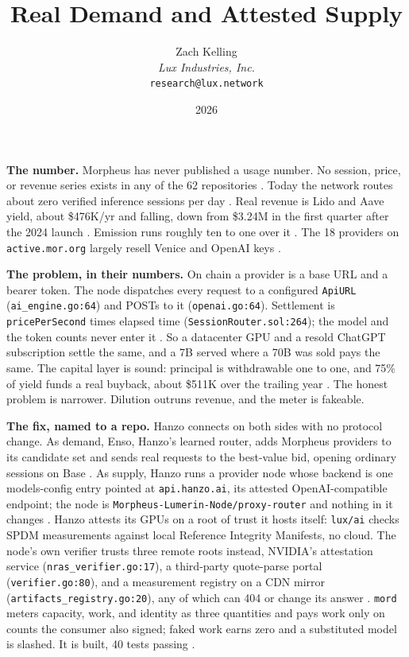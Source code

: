 \documentclass[11pt,a4paper]{article}
\title{Real Demand and Attested Supply}
\author{Zach Kelling\\\textit{Lux Industries, Inc.}\\\texttt{research@lux.network}}
\date{2026}
\newcommand{\code}[1]{\texttt{\small #1}}
\newcommand{\prov}[1]{{\color{muted}\scriptsize\sffamily[#1]}}
\begin{document}
\luxcoverpage
\sloppy

\par
\vspace{0.9ex}

\noindent\textbf{The number.}
Morpheus has never published a usage number. No session, price, or revenue series exists
in any of the 62 repositories \prov{verified}. Today the network routes about zero verified
inference sessions per day \prov{verified}. Real revenue is Lido and Aave yield, about
\$476K/yr and falling, down from \$3.24M in the first quarter after the 2024 launch
\prov{verified}. Emission runs roughly ten to one over it \prov{verified}. The 18 providers
on \code{active.mor.org} largely resell Venice and OpenAI keys \prov{verified}.

\vspace{0.35ex}
\noindent\textbf{The problem, in their numbers.}
On chain a provider is a base URL and a bearer token. The node dispatches every request to a
configured \code{ApiURL} (\code{ai\_engine.go:64}) and POSTs to it (\code{openai.go:64}).
Settlement is \code{pricePerSecond} times elapsed time (\code{SessionRouter.sol:264}); the
model and the token counts never enter it \prov{verified}. So a datacenter GPU and a resold
ChatGPT subscription settle the same, and a 7B served where a 70B was sold pays the same. The
capital layer is sound: principal is withdrawable one to one, and 75\% of yield funds a real
buyback, about \$511K over the trailing year \prov{verified}. The honest problem is narrower.
Dilution outruns revenue, and the meter is fakeable.

\vspace{0.35ex}
\noindent\textbf{The fix, named to a repo.}
Hanzo connects on both sides with no protocol change. As demand, Enso, Hanzo's learned router,
adds Morpheus providers to its candidate set and sends real requests to the best-value bid,
opening ordinary sessions on Base \prov{verified}. As supply, Hanzo runs a provider node whose
backend is one models-config entry pointed at \code{api.hanzo.ai}, its attested
OpenAI-compatible endpoint; the node is \code{Morpheus-Lumerin-Node/proxy-router} and nothing
in it changes \prov{verified}. Hanzo attests its GPUs on a root of trust it hosts itself:
\code{lux/ai} checks SPDM measurements against local Reference Integrity Manifests, no cloud.
The node's own verifier trusts three remote roots instead, NVIDIA's attestation service
(\code{nras\_verifier.go:17}), a third-party quote-parse portal (\code{verifier.go:80}), and a
measurement registry on a CDN mirror (\code{artifacts\_registry.go:20}), any of which can 404
or change its answer \prov{verified}. \code{mord} meters capacity, work, and identity as three
quantities and pays work only on counts the consumer also signed; faked work earns zero and a
substituted model is slashed. It is built, 40 tests passing \prov{verified}.
\end{document}
